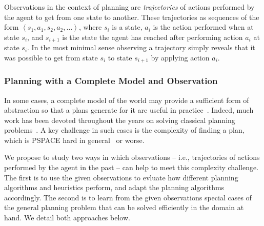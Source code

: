 \documentclass[12pt]{article}
\newcommand{\tuple}[1]{\ensuremath{\left \langle #1 \right \rangle }}
\begin{document}
Observations in the context of planning are {\em trajectories} of actions performed by the agent to get from one state to another. These trajectories as sequences of the form $\tuple{ s_1, a_1, s_2, a_2, \ldots}$, where $s_i$ is a state, $a_i$ is the action performed when at state $s_i$, and $s_{i+1}$ is the state the agent has reached after performing action $a_i$ at state $s_i$. In the most minimal sense observing a trajectory simply reveals that it was possible to get from state $s_i$ to state $s_{i+1}$ by applying action $a_i$. %




\subsubsection{Planning with a Complete Model and Observation}



In some cases, a complete model of the world may provide a sufficient form of abstraction so that a plans generate for it are useful in practice~\cite{citeSomeApplicationsOfPDDLPlanning}. Indeed, much work has been devoted throughout the years on solving classical planning problems~\cite{someManyPlanningPapers}. A key challenge in such cases is the complexity of finding a plan, which is PSPACE hard in general~\cite{bylander1994computational} or worse. %




We propose to study two ways in which observations -- i.e., trajectories of actions performed by the agent in the past -- can help to meet this complexity challenge. The first is to use the given observations to evluate how different planning algorithms and heuristics perform, and adapt the planning algorithms accordingly. The second is to learn from the given observations special cases of the general planning problem that can be solved efficiently in the domain at hand. We detail both  approaches below. 
\end{document}
